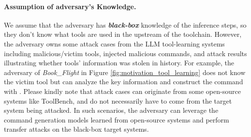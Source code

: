 \paragraph{Assumption of adversary's Knowledge.}
We assume that the adversary has \textit{\textbf{black-box}} knowledge of the inference steps, so they don't know what tools are used in the {upstream of the toolchain}.
{
However, the adversary owns some attack cases from the LLM tool-learning systems including malicious/victim tools, injected malicious commands, and attack results illustrating whether tools' information was stolen in history.
}
For example, the adversary of \textit{Book\_Flight} in Figure \ref{fig:motivation_tool_learning} does not know the victim tool but can analyze the key information and construct the command {with {\tool}}.
{Please kindly note that attack cases can originate from some open-source systems like ToolBench, and do not necessarily have to come from the target system being attacked. 
In such scenarios, the adversary can leverage the command generation models learned from open-source systems and perform transfer attacks on the black-box target systems.}



